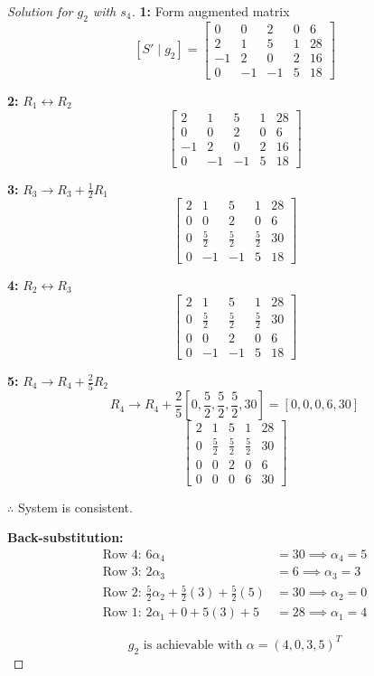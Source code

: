 \documentclass[12pt]{article}
\theoremstyle{definition}
\begin{document}
\begin{proof}[Solution for $g_2$ with $s_4$]

\textbf{1:} Form augmented matrix
\[
[S' \mid g_2] = \left[\begin{array}{cccc|c}
0 & 0 & 2 & 0 & 6 \\
2 & 1 & 5 & 1 & 28 \\
-1 & 2 & 0 & 2 & 16 \\
0 & -1 & -1 & 5 & 18
\end{array}\right]
\]

\textbf{2:} $R_1 \leftrightarrow R_2$
\[
\left[\begin{array}{cccc|c}
2 & 1 & 5 & 1 & 28 \\
0 & 0 & 2 & 0 & 6 \\
-1 & 2 & 0 & 2 & 16 \\
0 & -1 & -1 & 5 & 18
\end{array}\right]
\]

\textbf{3:} $R_3 \to R_3 + \frac{1}{2}R_1$
\[
\left[\begin{array}{cccc|c}
2 & 1 & 5 & 1 & 28 \\
0 & 0 & 2 & 0 & 6 \\
0 & \frac{5}{2} & \frac{5}{2} & \frac{5}{2} & 30 \\
0 & -1 & -1 & 5 & 18
\end{array}\right]
\]

\textbf{4:} $R_2 \leftrightarrow R_3$
\[
\left[\begin{array}{cccc|c}
2 & 1 & 5 & 1 & 28 \\
0 & \frac{5}{2} & \frac{5}{2} & \frac{5}{2} & 30 \\
0 & 0 & 2 & 0 & 6 \\
0 & -1 & -1 & 5 & 18
\end{array}\right]
\]

\textbf{5:} $R_4 \to R_4 + \frac{2}{5}R_2$
\[
R_4 \to R_4 + \frac{2}{5}\left[0, \frac{5}{2}, \frac{5}{2}, \frac{5}{2}, 30\right] = \left[0, 0, 0, 6, 30\right]
\]
\[
\left[\begin{array}{cccc|c}
2 & 1 & 5 & 1 & 28 \\
0 & \frac{5}{2} & \frac{5}{2} & \frac{5}{2} & 30 \\
0 & 0 & 2 & 0 & 6 \\
0 & 0 & 0 & 6 & 30
\end{array}\right]
\]

$\therefore$ System is consistent.

\textbf{Back-substitution:}
\begin{align*}
\text{Row 4: } 6\alpha_4 &= 30 \implies \alpha_4 = 5 \\
\text{Row 3: } 2\alpha_3 &= 6 \implies \alpha_3 = 3 \\
\text{Row 2: } \frac{5}{2}\alpha_2 + \frac{5}{2}(3) + \frac{5}{2}(5) &= 30 \implies \alpha_2 = 0 \\
\text{Row 1: } 2\alpha_1 + 0 + 5(3) + 5 &= 28 \implies \alpha_1 = 4
\end{align*}

\[
\boxed{g_2 \text{ is achievable with } \alpha = (4, 0, 3, 5)^T}
\]
\end{proof}
\end{document}
